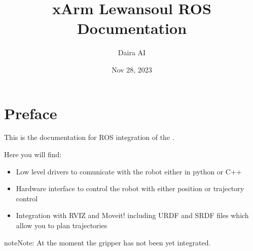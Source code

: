 \documentclass[letterpaper,10pt,english]{sphinxmanual}
\title{xArm Lewansoul ROS Documentation}
\date{Nov 28, 2023}
\author{Daira AI}
\begin{document}
\pagestyle{empty}

    \begin{titlepage}

    

    \makecover

    \end{titlepage}
    \clearpage
    \tableofcontents
    \clearpage
    
\pagestyle{plain}
 
\pagestyle{normal}
\label{\detokenize{index::doc}}



\chapter{Preface}
\label{\detokenize{index:preface}}
\sphinxAtStartPar
This is the documentation for ROS integration of the .

\begin{figure}[htbp]
\centering

\noindent{}
\end{figure}

\sphinxAtStartPar
Here you will find:
\begin{itemize}
\item {} 
\sphinxAtStartPar
Low level drivers to comunicate with the robot either in python or C++

\item {} 
\sphinxAtStartPar
Hardware interface to control the robot with either position or trajectory control

\item {} 
\sphinxAtStartPar
Integration with RVIZ and Moveit! including URDF and SRDF files which allow you to plan trajectories

\end{itemize}

\begin{sphinxadmonition}{note}{Note:}
\sphinxAtStartPar
At the moment the gripper has not been yet integrated.
\end{sphinxadmonition}
\end{document}
